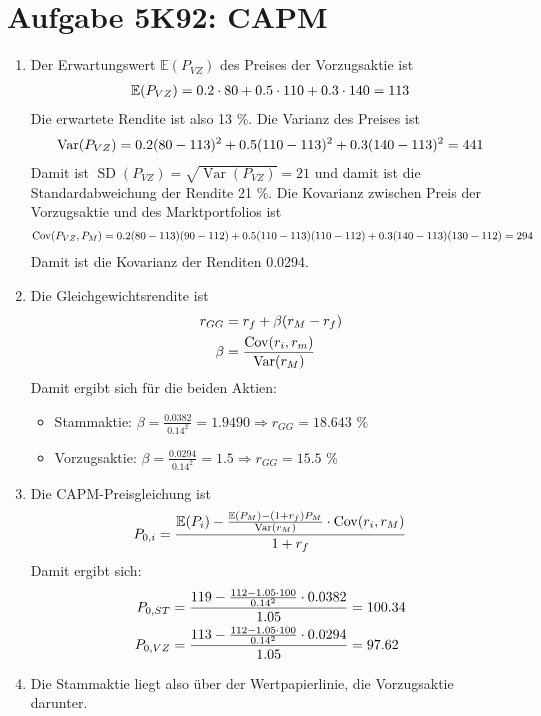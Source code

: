 \documentclass{article}
\newcommand{\E}{\mathbb{E}}
\DeclareMathOperator{\Var}{Var}
\DeclareMathOperator{\Cov}{Cov}
\DeclareMathOperator{\SD}{SD}
\begin{document}
	\section*{Aufgabe 5K92: CAPM}
	\begin{enumerate}[label=(\alph*)]
		\item Der Erwartungswert $\E(P_{VZ})$ des Preises der Vorzugsaktie ist
		\begin{align}
			\E(P_{VZ}) = 0.2\cdot 80 + 0.5\cdot 110 + 0.3\cdot 140 = 113 \notag
		\end{align}
		Die erwartete Rendite ist also 13 \%. Die Varianz des Preises ist
		\begin{align}
			\Var(P_{VZ}) = 0.2(80-113)^2 + 0.5(110-113)^2 + 0.3(140-113)^2 = 441 \notag
		\end{align}
		Damit ist $\SD(P_{VZ})=\sqrt{\Var(P_{VZ})}=21$ und damit ist die Standardabweichung der Rendite 21 \%. Die Kovarianz zwischen Preis der Vorzugsaktie und des Marktportfolios ist
		\begin{align}
			\Cov(P_{VZ},P_M) = 0.2(80-113)(90-112) + 0.5(110-113)(110-112) + 0.3(140-113)(130-112) = 294 \notag
		\end{align}
		Damit ist die Kovarianz der Renditen 0.0294.
		\item Die Gleichgewichtsrendite ist
		\begin{align}
			r_{GG} &= r_f + \beta(r_M-r_f) \notag \\
			\beta &= \frac{\Cov(r_i,r_m)}{\Var(r_M)} \notag
		\end{align}
		Damit ergibt sich für die beiden Aktien:
		\begin{itemize}
			\item Stammaktie: $\beta = \frac{0.0382}{0.14^2}=1.9490 \Rightarrow r_{GG}=18.643\text{ \%}$ 
			\item Vorzugsaktie: $\beta = \frac{0.0294}{0.14^2}=1.5 \Rightarrow r_{GG}=15.5\text{ \%}$
		\end{itemize}
		\item Die CAPM-Preisgleichung ist
		\begin{align}
			P_{0,i} = \frac{\E(P_i) - \frac{\E(P_M) - (1+r_f)P_M}{\Var(r_M)}\cdot\Cov(r_i,r_M)}{1+r_f} \notag
		\end{align}
		Damit ergibt sich:
		\begin{align}
			P_{0,ST} &= \frac{119 - \frac{112 - 1.05\cdot 100}{0.14^2}\cdot 0.0382}{1.05} = 100.34 \notag \\
			P_{0,VZ} &= \frac{113 - \frac{112 - 1.05\cdot 100}{0.14^2}\cdot 0.0294}{1.05} = 97.62 \notag
		\end{align}
		\item Die Stammaktie liegt also über der Wertpapierlinie, die Vorzugsaktie darunter.
	\end{enumerate}
	
\end{document}
